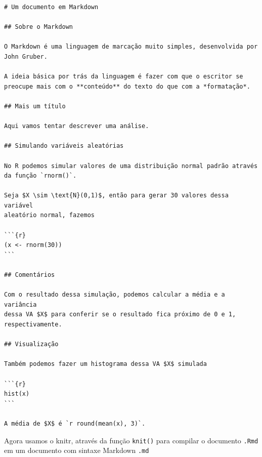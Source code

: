 \documentclass[
  10pt,
  a4paper]{book}
\begin{document}
\begin{verbatim}
# Um documento em Markdown

## Sobre o Markdown

O Markdown é uma linguagem de marcação muito simples, desenvolvida por
John Gruber.

A ideia básica por trás da linguagem é fazer com que o escritor se
preocupe mais com o **conteúdo** do texto do que com a *formatação*.

## Mais um título

Aqui vamos tentar descrever uma análise.

## Simulando variáveis aleatórias

No R podemos simular valores de uma distribuição normal padrão através
da função `rnorm()`.

Seja $X \sim \text{N}(0,1)$, então para gerar 30 valores dessa variável
aleatório normal, fazemos

```{r}
(x <- rnorm(30))
```

## Comentários

Com o resultado dessa simulação, podemos calcular a média e a variância
dessa VA $X$ para conferir se o resultado fica próximo de 0 e 1,
respectivamente.

## Visualização

Também podemos fazer um histograma dessa VA $X$ simulada

```{r}
hist(x)
```

A média de $X$ é `r round(mean(x), 3)`.
\end{verbatim}

Agora usamos o knitr, através da função \texttt{knit()} para compilar o
documento \texttt{.Rmd} em um documento com sintaxe Markdown \texttt{.md}
\end{document}
